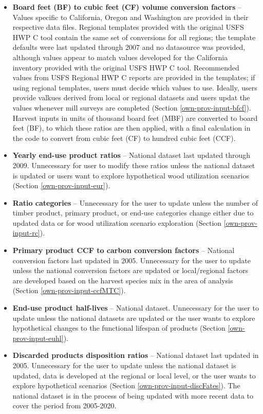 \documentclass[
  openany]{book}
\begin{document}
\begin{itemize}
\item
  \textbf{Board feet (BF) to cubic feet (CF) volume conversion factors} -- Values specific to California, Oregon and Washington are provided in their respective data files. Regional templates provided with the original USFS HWP C tool contain the same set of conversions for all regions; the template defaults were last updated through 2007 and no datasource was provided, although values appear to match values developed for the California inventory provided with the original USFS HWP C tool. Recommended values from USFS Regional HWP C reports are provided in the templates; if using regional templates, users must decide which values to use. Ideally, users provide valkues derived from local or regional datasets and users updat the values whenever mill surveys are completed (Section \ref{own-prov-input-bfcf}). Harvest inputs in units of thousand board feet (MBF) are converted to board feet (BF), to which these ratios are then applied, with a final calculation in the code to convert from cubic feet (CF) to hundred cubic feet (CCF).
\item
  \textbf{Yearly end-use product ratios} -- National dataset last updated through 2009. Unnecessary for user to modify these ratios unless the national dataset is updated or users want to explore hypothetical wood utilization scenarios (Section \ref{own-prov-input-eur}).
\item
  \textbf{Ratio categories} -- Unnecessary for the user to update unless the number of timber product, primary product, or end-use categories change either due to updated data or for wood utilization scenario exploration (Section \ref{own-prov-input-rc}).
\item
  \textbf{Primary product CCF to carbon conversion factors} -- National conversion factors last updated in 2005. Unnecessary for the user to update unless the national conversion factors are updated or local/regional factors are developed based on the harvest species mix in the area of analysis (Section \ref{own-prov-input-ccfMTC}).
\item
  \textbf{End-use product half-lives} -- National dataset. Unnecessary for the user to update unless the national datasets are updated or the user wants to explore hypothetical changes to the functional lifespan of products (Section \ref{own-prov-input-euhl}).
\item
  \textbf{Discarded products disposition ratios} -- National dataset last updated in 2005. Unnecessary for the user to update unless the national dataset is updated, data is developed at the regional or local level, or the user wants to explore hypothetical scenarios (Section \ref{own-prov-input-discFates}). The national dataset is in the process of being updated with more recent data \autocite{usepa2020} to cover the period from 2005-2020.

\end{itemize}
\end{document}
